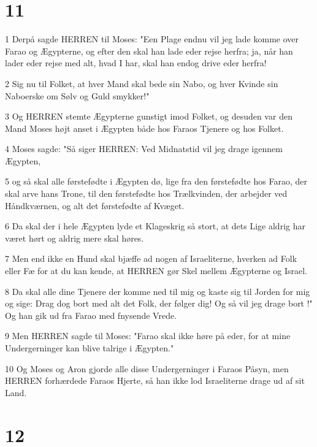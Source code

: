\chapter{11}

\par 1 Derpå sagde HERREN til Moses: "Een Plage endnu vil jeg lade komme over Farao og Ægypterne, og efter den skal han lade eder rejse herfra; ja, når han lader eder rejse med alt, hvad I har, skal han endog drive eder herfra!
\par 2 Sig nu til Folket, at hver Mand skal bede sin Nabo, og hver Kvinde sin Naboerske om Sølv og Guld smykker!"
\par 3 Og HERREN stemte Ægypterne gunstigt imod Folket, og desuden var den Mand Moses højt anset i Ægypten både hos Faraos Tjenere og hos Folket.
\par 4 Moses sagde: "Så siger HERREN: Ved Midnatstid vil jeg drage igennem Ægypten,
\par 5 og så skal alle førstefødte i Ægypten dø, lige fra den førstefødte hos Farao, der skal arve hans Trone, til den førstefødte hos Trælkvinden, der arbejder ved Håndkværnen, og alt det førstefødte af Kvæget.
\par 6 Da skal der i hele Ægypten lyde et Klageskrig så stort, at dets Lige aldrig har været hørt og aldrig mere skal høres.
\par 7 Men end ikke en Hund skal bjæffe ad nogen af Israeliterne, hverken ad Folk eller Fæ for at du kan kende, at HERREN gør Skel mellem Ægypterne og Israel.
\par 8 Da skal alle dine Tjenere der komme ned til mig og kaste sig til Jorden for mig og sige: Drag dog bort med alt det Folk, der følger dig! Og så vil jeg drage bort !" Og han gik ud fra Farao med fnysende Vrede.
\par 9 Men HERREN sagde til Moses: "Farao skal ikke høre på eder, for at mine Undergerninger kan blive talrige i Ægypten."
\par 10 Og Moses og Aron gjorde alle disse Undergerninger i Faraos Påsyn, men HERREN forhærdede Faraos Hjerte, så han ikke lod Israeliterne drage ud af sit Land.

\chapter{12}

